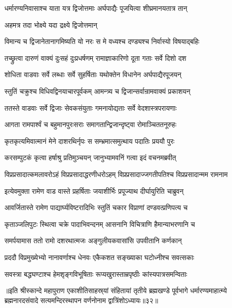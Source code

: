 \twolineshloka
{धर्मारण्यनिवासाश्च याता यत्र द्विजोत्तमाः}
{अर्घपाद्यैः पूजयित्वा शीघ्रमानयतात्र तान्}%

\onelineshloka
{अहमत्र तदा भोक्ष्ये यदा द्रक्ष्ये द्विजोत्तमान्}%

\twolineshloka
{विमान्य च द्विजानेतानागमिष्यति यो नरः}
{स मे वध्यश्च दण्ड्यश्च निर्वास्यो विषयाद्बहिः}%

\twolineshloka
{तच्छ्रुत्वा दारुणं वाक्यं दुःसहं दुःप्रधर्षणम्}
{रामाज्ञाकारिणो दूता गताः सर्वे दिशो दश}%

\twolineshloka
{शोधिता वाडवाः सर्वे लब्धाः सर्वे सुहर्षिताः}
{यथोक्तेन विधानेन अर्घपाद्यैरपूजयन्}%

\twolineshloka
{स्तुतिं चक्रुश्च विधिवद्विनयाचारपूर्वकम्}
{आमन्त्र्य च द्विजान्सर्वान्रामवाक्यं प्रकाशयन्}%

\twolineshloka
{ततस्ते वाडवाः सर्वे द्विजाः सेवकसंयुताः}
{गमनायोद्यताः सर्वे वेदशास्त्रपरायणाः}%

\twolineshloka
{आगता रामपार्श्वं च बहुमानपुरःसराः}
{समागतान्द्विजान्दृष्ट्वा रोमाञ्चिततनूरुहः}%

\twolineshloka
{कृतकृत्यमिवात्मानं मेने दाशरथिर्नृपः}
{स सम्भ्रमात्समुत्थाय पदातिः प्रययौ पुरः}%

\twolineshloka
{करसम्पुटकं कृत्वा हर्षाश्रु प्रतिमुञ्चयन्}
{जानुभ्यामवनिं गत्वा इदं वचनमब्रवीत्}%

\twolineshloka
{विप्रप्रसादात्कमलावरोऽहं विप्रप्रसादाद्धरणीधरोऽहम्}
{विप्रप्रसादाज्जगतीपतिश्च विप्रप्रसादान्मम रामनाम}%

\twolineshloka
{इत्येवमुक्ता रामेण वाड वास्ते प्रहर्षिताः}
{जयाशीर्भिः प्रपूज्याथ दीर्घायुरिति चाब्रुवन्}%

\twolineshloka
{आवर्जितास्ते रामेण पाद्यार्घ्यविष्टरादिभिः}
{स्तुतिं चकार विप्राणां दण्डवत्प्रणिपत्य च}%

\twolineshloka
{कृताञ्जलिपुटः स्थित्वा चक्रे पादाभिवन्दनम्}
{आसनानि विचित्राणि हैमान्याभरणानि च}%

\twolineshloka
{समर्पयामास ततो रामो दशरथात्मजः}
{अङ्गुलीयकवासांसि उपवीतानि कर्णकान्}%

\twolineshloka
{प्रददौ विप्रमुख्येभ्यो नानावर्णाश्च धेनवः}
{एकैकशत सङ्ख्याका घटोध्नीश्च सवत्सकाः}%

\twolineshloka
{सवस्त्रा बद्धघण्टाश्च हेमशृङ्गविभूषिताः}
{रूप्यखुरास्ताम्रपृष्ठीः कांस्यपात्रसमन्विताः}%

॥इति श्रीस्कान्दे महापुराण एकाशीतिसाहस्र्यां संहितायां तृतीये ब्रह्मखण्डे पूर्वभागे धर्मारण्यमाहात्म्ये ब्रह्मनारदसंवादे सत्यमन्दिरस्थापन वर्णनोनाम द्वात्रिंशोऽध्यायः॥३२॥

